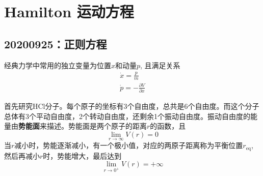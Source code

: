 \chapter{Hamilton 运动方程}
    \section{20200925：正则方程}

    经典力学中常用的独立变量为位置$x$和动量$p$, 且满足关系
    \begin{align*}
        \dot{x} = \frac pm\\
        \dot{p} = -\frac {\partial V}{\partial x}
    \end{align*}

    首先研究HCl分子。每个原子的坐标有3个自由度，总共是6个自由度。而这个分子总体有3个平动自由度，2个转动自由度，还剩余1个振动自由度。振动自由度的能量由\textbf{势能面}来描述。势能面是两个原子的距离$r$的函数，且
    \begin{equation*}
        \lim_{r \to \infty} V(r) = 0
    \end{equation*}
    当$r$减小时，势能逐渐减小，有一个极小值，对应的两原子距离称为平衡位置$r_\mathrm{eq}$, 然后再减小$r$时，势能增大，最后达到
    \begin{equation*}
        \lim_{r \to 0^+} V(r) = +\infty
    \end{equation*}

